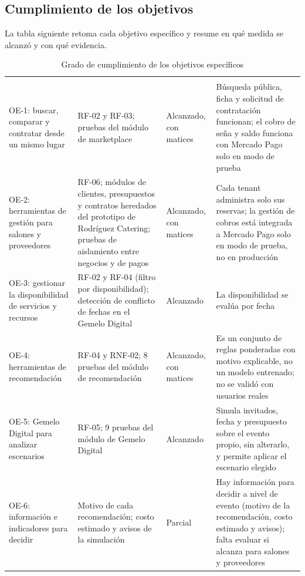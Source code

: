 \subsection{Cumplimiento de los objetivos}

La tabla siguiente retoma cada objetivo específico y resume en qué
medida se alcanzó y con qué evidencia.

\small
\begin{xltabular}{\textwidth}{p{3.1cm} X p{2.1cm} X}
    \caption{Grado de cumplimiento de los objetivos específicos}
    \label{tab:cumplimiento} \\
    \toprule
     &  &  &  \\
    \midrule
    \endfirsthead
    \toprule
     &  &  &  \\
    \midrule
    \endhead
    \bottomrule
    \endfoot
    OE-1: buscar, comparar y contratar desde un mismo lugar & RF-02 y RF-03; pruebas del módulo de marketplace & Alcanzado, con matices & Búsqueda pública, ficha y solicitud de contratación funcionan; el cobro de seña y saldo funciona con Mercado Pago solo en modo de prueba \\
    OE-2: herramientas de gestión para salones y proveedores & RF-06; módulos de clientes, presupuestos y contratos heredados del prototipo de Rodríguez Catering; pruebas de aislamiento entre negocios y de pagos & Alcanzado, con matices & Cada tenant administra solo sus reservas; la gestión de cobros está integrada a Mercado Pago solo en modo de prueba, no en producción \\
    OE-3: gestionar la disponibilidad de servicios y recursos & RF-02 y RF-04 (filtro por disponibilidad); detección de conflicto de fechas en el Gemelo Digital & Alcanzado & La disponibilidad se evalúa por fecha \\
    OE-4: herramientas de recomendación & RF-04 y RNF-02; 8 pruebas del módulo de recomendación & Alcanzado, con matices & Es un conjunto de reglas ponderadas con motivo explicable, no un modelo entrenado; no se validó con usuarios reales \\
    OE-5: Gemelo Digital para analizar escenarios & RF-05; 9 pruebas del módulo de Gemelo Digital & Alcanzado & Simula invitados, fecha y presupuesto sobre el evento propio, sin alterarlo, y permite aplicar el escenario elegido \\
    OE-6: información e indicadores para decidir & Motivo de cada recomendación; costo estimado y avisos de la simulación & Parcial & Hay información para decidir a nivel de evento (motivo de la recomendación, costo estimado y avisos); falta evaluar si alcanza para salones y proveedores \\
\end{xltabular}
\normalsize

